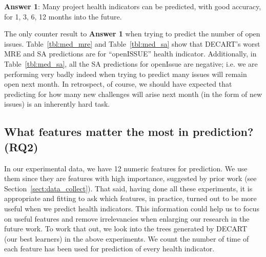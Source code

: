 \documentclass[sigconf,review,anonymous]{acmart}
\begin{document}
  
\begin{blockquote}
\noindent
\textbf{Answer 1}: Many project health indicators can be predicted, with good accuracy, for 1, 3, 6, 12   months into the future.
\end{blockquote}

The only counter result to {\bf Answer 1} when trying to  predict  the number of open 
issues.
Table~\ref{tbl:med_mre} and 
Table~\ref{tbl:med_sa} show that 
DECART's worst MRE and SA predictions are for ``openISSUE'' health indicator.
Additionally, in  Table~\ref{tbl:med_sa}, all the SA predictions for openIssue are negative; i.e.   we are performing very badly indeed when trying to predict many issues will remain open next month. In retrospect, of course, we should have expected that predicting for how many new challenges will arise next month (in the form of new issues) is an inherently hard task. 



\subsection{What features matter the most in prediction? (RQ2)}
In our experimental data, we have 12 numeric features for prediction.
We use them since they are features with high importance, suggested by prior work (see Section~\ref{sect:data_collect}).
That said, having done all these experiments, it is appropriate and fitting to ask which features, in practice, turned out to be more useful when we predict health indicators.   This information could help us to focus on useful features and remove irrelevancies when enlarging our research in the future work. To work that out, we look into the trees generated by DECART
(our best learners) in the above experiments.   We count the number of time of each feature has been used for prediction of every health indicator. 
\end{document}
